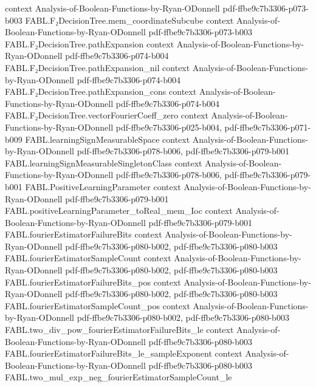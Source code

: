 \begin{theorem}
  {context}
  {Analysis-of-Boolean-Functions-by-Ryan-ODonnell}
  {pdf-ffbe9c7b3306-p073-b003}
\proofstep
  {FABL.F₂DecisionTree.mem_coordinateSubcube}
  {context}
  {Analysis-of-Boolean-Functions-by-Ryan-ODonnell}
  {pdf-ffbe9c7b3306-p073-b003}
\proofstep
  {FABL.F₂DecisionTree.pathExpansion}
  {context}
  {Analysis-of-Boolean-Functions-by-Ryan-ODonnell}
  {pdf-ffbe9c7b3306-p074-b004}
\proofstep
  {FABL.F₂DecisionTree.pathExpansion_nil}
  {context}
  {Analysis-of-Boolean-Functions-by-Ryan-ODonnell}
  {pdf-ffbe9c7b3306-p074-b004}
\proofstep
  {FABL.F₂DecisionTree.pathExpansion_cons}
  {context}
  {Analysis-of-Boolean-Functions-by-Ryan-ODonnell}
  {pdf-ffbe9c7b3306-p074-b004}
\proofstep
  {FABL.F₂DecisionTree.vectorFourierCoeff_zero}
  {context}
  {Analysis-of-Boolean-Functions-by-Ryan-ODonnell}
  {pdf-ffbe9c7b3306-p025-b004,
    pdf-ffbe9c7b3306-p071-b009}
\proofstep
  {FABL.learningSignMeasurableSpace}
  {context}
  {Analysis-of-Boolean-Functions-by-Ryan-ODonnell}
  {pdf-ffbe9c7b3306-p078-b006,
    pdf-ffbe9c7b3306-p079-b001}
\proofstep
  {FABL.learningSignMeasurableSingletonClass}
  {context}
  {Analysis-of-Boolean-Functions-by-Ryan-ODonnell}
  {pdf-ffbe9c7b3306-p078-b006,
    pdf-ffbe9c7b3306-p079-b001}
\proofstep
  {FABL.PositiveLearningParameter}
  {context}
  {Analysis-of-Boolean-Functions-by-Ryan-ODonnell}
  {pdf-ffbe9c7b3306-p079-b001}
\proofstep
  {FABL.positiveLearningParameter_toReal_mem_Ioc}
  {context}
  {Analysis-of-Boolean-Functions-by-Ryan-ODonnell}
  {pdf-ffbe9c7b3306-p079-b001}
\proofstep
  {FABL.fourierEstimatorFailureBits}
  {context}
  {Analysis-of-Boolean-Functions-by-Ryan-ODonnell}
  {pdf-ffbe9c7b3306-p080-b002,
    pdf-ffbe9c7b3306-p080-b003}
\proofstep
  {FABL.fourierEstimatorSampleCount}
  {context}
  {Analysis-of-Boolean-Functions-by-Ryan-ODonnell}
  {pdf-ffbe9c7b3306-p080-b002,
    pdf-ffbe9c7b3306-p080-b003}
\proofstep
  {FABL.fourierEstimatorFailureBits_pos}
  {context}
  {Analysis-of-Boolean-Functions-by-Ryan-ODonnell}
  {pdf-ffbe9c7b3306-p080-b002,
    pdf-ffbe9c7b3306-p080-b003}
\proofstep
  {FABL.fourierEstimatorSampleCount_pos}
  {context}
  {Analysis-of-Boolean-Functions-by-Ryan-ODonnell}
  {pdf-ffbe9c7b3306-p080-b002,
    pdf-ffbe9c7b3306-p080-b003}
\proofstep
  {FABL.two_div_pow_fourierEstimatorFailureBits_le}
  {context}
  {Analysis-of-Boolean-Functions-by-Ryan-ODonnell}
  {pdf-ffbe9c7b3306-p080-b003}
\proofstep
  {FABL.fourierEstimatorFailureBits_le_sampleExponent}
  {context}
  {Analysis-of-Boolean-Functions-by-Ryan-ODonnell}
  {pdf-ffbe9c7b3306-p080-b003}
\proofstep
  {FABL.two_mul_exp_neg_fourierEstimatorSampleCount_le}

\end{theorem}
